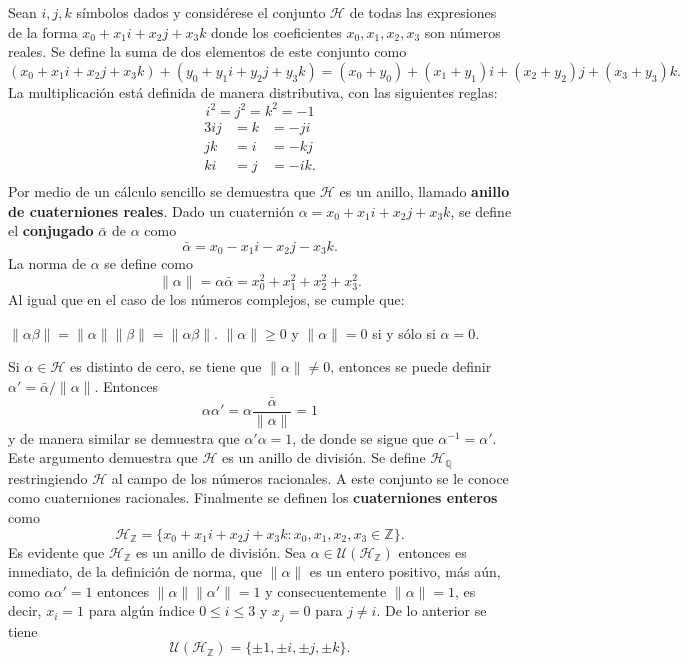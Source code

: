 \begin{ejemplo}
Sean $i,j,k$ símbolos dados y considérese el conjunto $\mathcal{H}$ de todas las expresiones de la forma $x_0 + x_1i+x_2j+x_3k$ donde los coeficientes $x_0,x_1,x_2,x_3$ son números reales.
Se define la suma de dos elementos de este conjunto como \[ (x_0 + x_1i+x_2j+x_3k)+(y_0 + y_1i+y_2j+y_3k) = (x_0 + y_0) + (x_1 + y_1)i + (x_2+y_2)j + (x_3+y_3)k.  \] La multiplicación está definida de manera distributiva, con las siguientes reglas:
\begin{equation*}
i^2 = j^2 = k^2 =-1
\end{equation*}
\vspace*{-5.1em}
\begin{alignat*}{3}
ij &= k &= -ji\\
jk &= i &= -kj\\
ki &= j &= -ik.\\
\end{alignat*}
 Por medio de un cálculo sencillo se demuestra que $\mathcal{H}$ es un anillo, llamado \textbf{anillo de cuaterniones reales}. Dado un cuaternión $\alpha = x_0 + x_1i + x_2j + x_3k$, se define el \textbf{conjugado} $\bar{\alpha}$ de $\alpha$ como \[ \bar{\alpha} = x_0-x_1i - x_2j-x_3k. \] La norma de $\alpha$ se define como \[ \lVert \alpha \rVert = \alpha\bar{\alpha} = x_0 ^2 + x_1^2 + x_ 2^2 + x_ 3^2. \]
Al igual que en el caso de los números complejos, se cumple que:
\begin{bulletList}
\newItem $\lVert \alpha\beta \rVert = \lVert \alpha \rVert \lVert \beta \rVert = \lVert \alpha\beta \rVert$.
\newItem $\lVert \alpha \rVert \geq 0$ y $\lVert \alpha \rVert  = 0 $ si y sólo si $\alpha = 0 $.
\end{bulletList}
Si $\alpha \in \mathcal{H}$ es distinto de cero, se tiene que $\lVert \alpha \rVert \neq 0$, entonces se puede definir $\alpha' = \bar{\alpha}/\lVert \alpha \rVert$. Entonces \[ \alpha\alpha'= \alpha \frac{\bar{\alpha}}{\lVert \alpha \rVert} = 1 \] y de manera similar se demuestra que $\alpha'\alpha = 1$, de donde se sigue que $\alpha^{-1} = \alpha'$. Este argumento demuestra que $\mathcal{H}$ es un anillo de división.
Se define $\mathcal{H}_{\mathds{Q}}$ restringiendo $\mathcal{H}$ al campo de los números racionales. A este conjunto se le conoce como cuaterniones racionales.
Finalmente se definen los \textbf{cuaterniones enteros} como \[ \mathcal{H}_{\mathds{Z}} = \{ x_0 + x_1i + x_2j + x_3k \colon x_0, x_1, x_2, x_3 \in \mathds{Z} \}. \]
Es evidente que $\mathcal{H}_{\mathds{Z}}$ es un anillo de división.
Sea $\alpha \in \mathcal{U}(\mathcal{H}_{\mathds{Z}})$ entonces es inmediato, de la definición de norma, que $\lVert \alpha \rVert$ es un entero positivo, más aún, como $\alpha\alpha'= 1$ entonces $\lVert \alpha \rVert \lVert \alpha'\rVert = 1$ y consecuentemente $\lVert \alpha \rVert = 1$, es decir, $x_i = 1$ para algún índice $0\leq i \leq 3 $ y $x_j = 0 $ para $j \neq i$. De lo anterior se tiene \[ \mathcal{U}(\mathcal{H}_{\mathds{Z}}) = \{ \pm1, \pm i, \pm j, \pm k \}. \] 
\end{ejemplo} 
